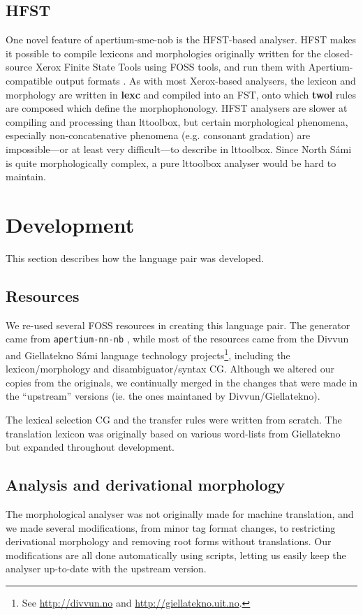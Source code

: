 \subsection{HFST}
\label{sec:hfst}
One novel feature of apertium-sme-nob is the HFST-based analyser. HFST
makes it possible to compile lexicons and morphologies originally
written for the closed-source Xerox Finite State Tools using FOSS
tools, and run them with Apertium-compatible output formats
\citep{pirinen2011compiling}. As with most Xerox-based analysers, the
\sme{} lexicon and morphology are written in \textbf{lexc} and
compiled into an FST, onto which \textbf{twol} rules are composed
which define the morphophonology. HFST analysers are slower at
compiling and processing than lttoolbox, but certain morphological
phenomena, especially non-concatenative phenomena (e.g. \sme{}
consonant gradation) are impossible---or at least very difficult---to
describe in lttoolbox. Since North S\'{a}mi is quite morphologically
complex, a pure lttoolbox analyser would be hard to maintain.


\section{Development}
  \label{sec:development}

This section describes how the language pair was developed.
\subsection{Resources}
We re-used several FOSS resources in creating this language pair. The
\nob{} generator came from {\tt apertium-nn-nb}
\citep{unhammer2009rfr}, while most of the \sme{} resources came from
the Divvun and Giellatekno S\'{a}mi language technology
projects\footnote{See \href{http://divvun.no}{http://divvun.no} and
  \href{http://giellatekno.uit.no}{http://giellatekno.uit.no}.},
including the lexicon/morphology and disambiguator/syntax CG. Although
we altered our copies from the originals, we continually merged in the
changes that were made in the ``upstream'' versions (ie. the ones
maintaned by Divvun/Giellatekno).

The lexical selection CG and the transfer rules were written from
scratch. The translation lexicon was originally based on various
word-lists from Giellatekno but expanded throughout development.
\subsection{Analysis and derivational morphology}
The morphological analyser was not originally made for machine
translation, and we made several modifications, from minor tag format
changes, to restricting derivational morphology and removing root
forms without translations. Our modifications are all done
automatically using scripts, letting us easily keep the analyser
up-to-date with the upstream version.

